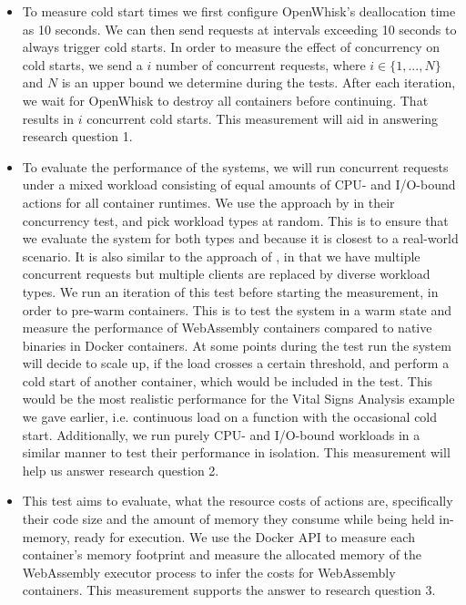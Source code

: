 \begin{itemize}
    \item To measure cold start times we first configure OpenWhisk's deallocation time as 10 seconds. We can then send requests at intervals exceeding 10 seconds to always trigger cold starts. In order to measure the effect of concurrency on cold starts, we send a $i$ number of concurrent requests, where $i \in \{1,...,N\}$ and $N$ is an upper bound we determine during the tests. After each iteration, we wait for OpenWhisk to destroy all containers before continuing. That results in $i$ concurrent cold starts. This measurement will aid in answering research question 1.

    \item To evaluate the performance of the systems, we will run concurrent requests under a mixed workload consisting of equal amounts of CPU- and I/O-bound actions for all container runtimes. We use the approach by \citeauthor{McGrath2017} in their concurrency test, and pick workload types at random. This is to ensure that we evaluate the system for both types and because it is closest to a real-world scenario. It is also similar to the approach of \citeauthor{Hall2019}, in that we have multiple concurrent requests but multiple clients are replaced by diverse workload types. We run an iteration of this test before starting the measurement, in order to pre-warm containers. This is to test the system in a warm state and measure the performance of WebAssembly containers compared to native binaries in Docker containers. At some points during the test run the system will decide to scale up, if the load crosses a certain threshold, and perform a cold start of another container, which would be included in the test. This would be the most realistic performance for the Vital Signs Analysis example we gave earlier, i.e. continuous load on a function with the occasional cold start. Additionally, we run purely CPU- and I/O-bound workloads in a similar manner to test their performance in isolation. This measurement will help us answer research question 2.

    \item This test aims to evaluate, what the resource costs of actions are, specifically their code size and the amount of memory they consume while being held in-memory, ready for execution. We use the Docker API to measure each container's memory footprint and measure the allocated memory of the WebAssembly executor process to infer the costs for WebAssembly containers. This measurement supports the answer to research question 3.
\end{itemize}

